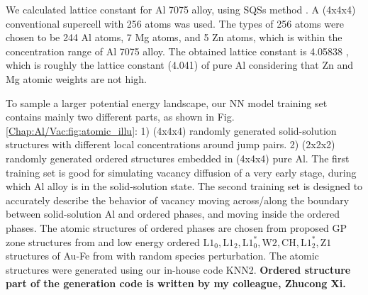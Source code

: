 We calculated lattice constant for Al 7075 alloy, using \acfp{SQS} method \cite{zunger1990special}. A (4x4x4) conventional supercell with 256 atoms was used. The types of 256 atoms were chosen to be 244 Al atoms, 7 Mg atoms, and 5 Zn atoms, which is within the concentration range of Al 7075 alloy. The obtained lattice constant is 4.05838 \angstrom, which is roughly the lattice constant (4.041\angstrom) of pure Al considering that Zn and Mg atomic weights are not high. \cite{haas2009calculation}


To sample a larger potential energy landscape, our \ac{NN} model training set contains mainly two different parts, as shown in Fig. \ref{Chap:Al/Vac:fig:atomic_illu}: 1) (4x4x4) randomly generated solid-solution structures with different local concentrations around jump pairs. 2) (2x2x2) randomly generated ordered structures embedded in (4x4x4) pure Al. The first training set is good for simulating vacancy diffusion of a very early stage, during which Al alloy is in the solid-solution state. The second training set is designed to accurately describe the behavior of vacancy moving across/along the boundary between solid-solution Al and ordered phases, and moving inside the ordered phases. The atomic structures of ordered phases are chosen from proposed GP zone structures from \cite{berg2001gp} and low energy ordered $\text{L1}_\text{0}, \text{L1}_\text{2}, \text{L1}_\text{0}^*, \text{W2}, \text{CH}, \text{L1}_\text{2}^*, \text{Z1}$ structures of Au-Fe from \cite{zhuravlev2017phase} with random species perturbation. The atomic structures were generated using our in-house code KNN2. \cite{Zhang2020KNN2} \textbf{Ordered structure part of the generation code is written by my colleague, Zhucong Xi.}


